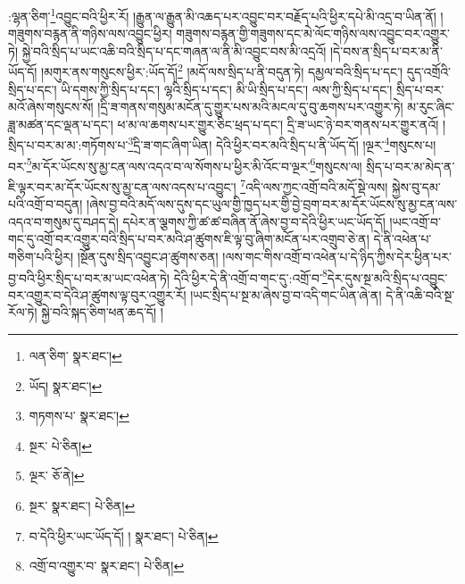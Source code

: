 :ལྷན་ཅིག་\footnote{ལན་ཅིག་  སྣར་ཐང་། }འབྱུང་བའི་ཕྱིར་རོ། །རྒྱུན་ལ་རྒྱུན་མི་འཆད་པར་འབྱུང་བར་བརྗོད་པའི་ཕྱིར་དཔེ་མི་འདྲ་བ་ཡིན་ནོ། །གཟུགས་བརྙན་ནི་གཉིས་ལས་འབྱུང་ཕྱིར། གཟུགས་བརྙན་གྱི་གཟུགས་དང་མེ་ལོང་གཉིས་ལས་འབྱུང་བར་འགྱུར་ཏེ། སྐྱེ་བའི་སྲིད་པ་ཡང་འཆི་བའི་སྲིད་པ་དང་གཞན་ལ་ནི་མི་འབྱུང་བས་མི་འདྲའོ། །དེ་བས་ན་སྲིད་པ་བར་མ་ནི་ཡོད་དོ། །མགུར་ནས་གསུངས་ཕྱིར་:ཡོད་དོ།\footnote{ཡོད།  སྣར་ཐང་། } །མདོ་ལས་སྲིད་པ་ནི་བདུན་ཏེ། དམྱལ་བའི་སྲིད་པ་དང་། དུད་འགྲོའི་སྲིད་པ་དང་། ཡི་དགས་ཀྱི་སྲིད་པ་དང་། ལྷའི་སྲིད་པ་དང་། མི་ཡི་སྲིད་པ་དང་། ལས་ཀྱི་སྲིད་པ་དང་། སྲིད་པ་བར་མའོ་ཞེས་གསུངས་སོ། །དྲི་ཟ་གནས་གསུམ་མངོན་དུ་གྱུར་པས་མའི་མངལ་དུ་བུ་ཆགས་པར་འགྱུར་ཏེ། མ་རུང་ཞིང་ཟླ་མཚན་དང་ལྡན་པ་དང་། ཕ་མ་ལ་ཆགས་པར་གྱུར་ཅིང་ཕྲད་པ་དང་། དྲི་ཟ་ཡང་ཉེ་བར་གནས་པར་གྱུར་ནའོ། །སྲིད་པ་བར་མ་མ་:གཏོགས་པ་\footnote{གཏགས་པ་  སྣར་ཐང་། }དྲི་ཟ་གང་ཞིག་ཡིན། དེའི་ཕྱིར་བར་མའི་སྲིད་པ་ནི་ཡོད་དོ། །ལྔར་\footnote{སྔར་  པེ་ཅིན། }གསུངས་པ། བར་\footnote{ལྔར་  ཅོ་ནེ། }མ་དོར་ཡོངས་སུ་མྱ་ངན་ལས་འདའ་བ་ལ་སོགས་པ་ཕྱིར་མི་འོང་བ་ལྔར་\footnote{སྔར་  སྣར་ཐང་།  པེ་ཅིན། }གསུངས་ལ། སྲིད་པ་བར་མ་མེད་ན་ཇི་ལྟར་བར་མ་དོར་ཡོངས་སུ་མྱ་ངན་ལས་འདས་པ་འབྱུང་། \footnote{བ་དེའི་ཕྱིར་ཡང་ཡོད་དོ། །   སྣར་ཐང་།  པེ་ཅིན། }འདི་ལས་ཀྱང་འགྲོ་བའི་མདོ་སྡེ་ལས། སྐྱེས་བུ་དམ་པའི་འགྲོ་བ་བདུན། །ཞེས་བྱ་བའི་མདོ་ལས་དུས་དང་ཡུལ་གྱི་ཁྱད་པར་གྱི་བྱེ་བྲག་བར་མ་དོར་ཡོངས་སུ་མྱ་ངན་ལས་འདའ་བ་གསུམ་དུ་བཤད་དེ། དཔེར་ན་ལྕགས་ཀྱི་ཚ་ཚ་བཞིན་ནོ་ཞེས་བྱ་བ་དེའི་ཕྱིར་ཡང་ཡོད་དོ། །ཡང་འགྲོ་བ་གང་དུ་འགྲོ་བར་འགྱུར་བའི་སྲིད་པ་བར་མའི་ཤ་ཚུགས་ཇི་ལྟ་བུ་ཞིག་མངོན་པར་འགྲུབ་ཅེ་ན། དེ་ནི་འཕེན་པ་གཅིག་པའི་ཕྱིར། །སྔོན་དུས་སྲིད་འབྱུང་ཤ་ཚུགས་ཅན། །ལས་གང་གིས་འགྲོ་བ་འཕེན་པ་དེ་ཉིད་ཀྱིས་དེར་ཕྱིན་པར་བྱ་བའི་ཕྱིར་སྲིད་པ་བར་མ་ཡང་འཕེན་ཏེ། དེའི་ཕྱིར་དེ་ནི་འགྲོ་བ་གང་དུ་:འགྲོ་བ་\footnote{འགྲོ་བ་འགྱུར་བ་  སྣར་ཐང་།  པེ་ཅིན། }དེར་དུས་སྔ་མའི་སྲིད་པ་འབྱུང་བར་འགྱུར་བ་དེའི་ཤ་ཚུགས་ལྟ་བུར་འགྱུར་རོ། །ཡང་སྲིད་པ་སྔ་མ་ཞེས་བྱ་བ་འདི་གང་ཡིན་ཞེ་ན། དེ་ནི་འཆི་བའི་སྔ་རོལ་ཏེ། སྐྱེ་བའི་སྐད་ཅིག་ཕན་ཆད་དོ། །
